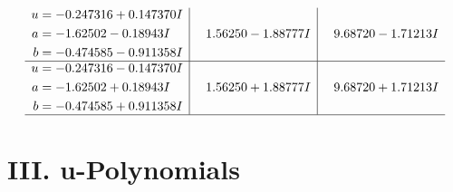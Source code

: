 \documentclass[1p]{elsarticle_modified}
\theoremstyle{definition}
\begin{document}
$$\begin{array}{c|c|c}
\begin{aligned}
u &= -0.247316 + 0.147370 I \\
a &= -1.62502 - 0.18943 I \\
b &= -0.474585 - 0.911358 I\end{aligned}
 & \phantom{-}1.56250 - 1.88777 I & \phantom{-}9.68720 - 1.71213 I \\ \hline\begin{aligned}
u &= -0.247316 - 0.147370 I \\
a &= -1.62502 + 0.18943 I \\
b &= -0.474585 + 0.911358 I\end{aligned}
 & \phantom{-}1.56250 + 1.88777 I & \phantom{-}9.68720 + 1.71213 I\\
 \hline 
 \end{array}$$\newpage
\newpage\renewcommand{\arraystretch}{1}
\centering \section*{ III. u-Polynomials}
\end{document}
